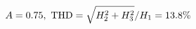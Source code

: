 \documentclass[preview]{standalone}
\begin{document}
\begin{align*}
\special{dvisvgm:raw <g id='unique000'>}A=0.75,\ \text{THD}=\sqrt{H_2^2+H_3^2}/H_1=13.8\%\special{dvisvgm:raw </g>}
\end{align*}
\end{document}
